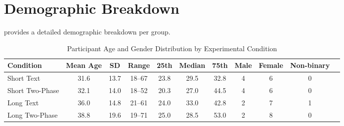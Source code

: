 \section{Demographic Breakdown}
\label{sec:apdx:demo}
 provides a detailed demographic breakdown per group.
\begin{table*}[h!]
\centering
\caption{Participant Age and Gender Distribution by Experimental Condition}
\label{tab:age_gender_distribution}
\begin{tabular}{lcccccccccc}
\hline
\textbf{Condition} & \textbf{Mean Age} & \textbf{SD} & \textbf{Range} & \textbf{25th} & \textbf{Median} & \textbf{75th} & \textbf{Male} & \textbf{Female} & \textbf{Non-binary} \\
\hline
Short Text      & 31.6  & 13.7 & 18--67 & 23.8 & 29.5 & 32.8 & 4 & 6 & 0 \\
Short Two-Phase   & 32.1  & 14.0 & 18--52 & 20.3 & 27.0 & 44.5 & 4 & 6 & 0 \\
Long Text       & 36.0  & 14.8 & 21--61 & 24.0 & 33.0 & 42.8 & 2 & 7 & 1 \\
Long Two-Phase    & 38.8  & 19.6 & 19--71 & 25.0 & 28.5 & 53.0 & 2 & 8 & 0 \\
\hline
\end{tabular}
\end{table*}
